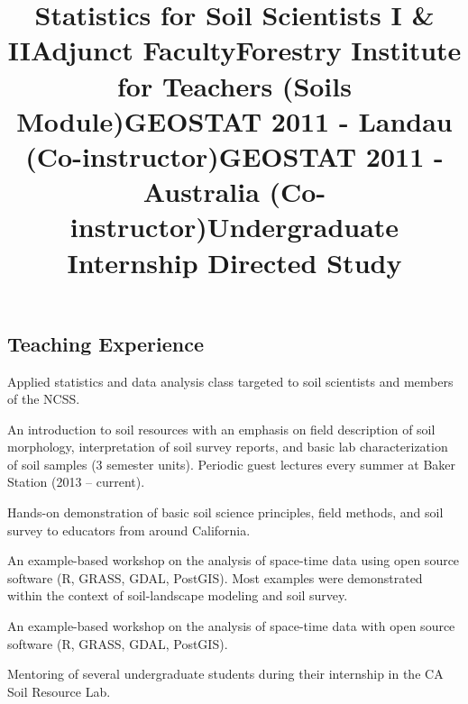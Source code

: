\documentclass[overlapped,line,10pt,letterpaper]{res}
\begin{document}
\begin{resume}
\section{\bf Teaching Experience}

\title{Statistics for Soil Scientists I \& II}
\begin{position}
Applied statistics and data analysis class targeted to soil scientists and members of the NCSS.
\end{position}

\title{Adjunct Faculty}
\begin{position}
An introduction to soil resources with an emphasis on field description of soil morphology, interpretation of soil survey reports, and basic lab characterization of soil samples (3 semester units). Periodic guest lectures every summer at Baker Station (2013 -- current).
\end{position}

\title{Forestry Institute for Teachers (Soils Module)}
\begin{position}
Hands-on demonstration of basic soil science principles, field methods, and soil survey to educators from around California.
\end{position}

\title{GEOSTAT 2011 - Landau (Co-instructor)}
\begin{position}
An example-based workshop on the analysis of space-time data using open source software (R, GRASS, GDAL, PostGIS). Most examples were demonstrated within the context of soil-landscape modeling and soil survey.
\end{position}

\title{GEOSTAT 2011 - Australia (Co-instructor)}
\begin{position}
An example-based workshop on the analysis of space-time data with open source software (R, GRASS, GDAL, PostGIS).
\end{position}

\title{Undergraduate Internship Directed Study}
\begin{position}
Mentoring of several undergraduate students during their internship in the CA Soil Resource Lab.
\end{position}


\end{resume}
\end{document}
